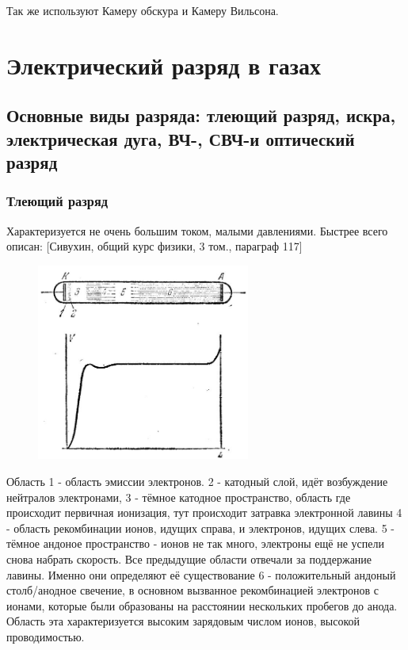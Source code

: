\documentclass[10pt, a4paper]{article}
\let\stdsection\section
\renewcommand\section{\newpage\stdsection}
\begin{document}
Так же используют Камеру обскура и Камеру Вильсона.

\section{Электрический разряд в газах}

\subsection{Основные виды разряда: тлеющий разряд, искра, электрическая дуга, ВЧ-, СВЧ-и оптический разряд}
\subsubsection{Тлеющий разряд}
Характеризуется не очень большим током, малыми давлениями.
Быстрее всего описан: [Сивухин, общий курс физики, 3 том., параграф 117]

\begin{figure}[ht]
	\begin{center}
		\includegraphics[width=70mm]{12.1.JPG}
	\end{center}
\end{figure}

Область 1 - область эмиссии электронов. 2 - катодный слой, идёт возбуждение нейтралов электронами, 3 - тёмное катодное пространство, область где происходит первичная ионизация, тут происходит затравка электронной лавины 4 - область рекомбинации ионов, идущих справа, и электронов, идущих слева. 5 - тёмное андоное пространство - ионов не так много, электроны ещё не успели снова набрать скорость. Все предыдущие области отвечали за поддержание лавины. Именно они определяют её существование  6 - положительный андоный столб/анодное свечение, в основном вызванное рекомбинацией электронов с ионами, которые были образованы на расстоянии нескольких пробегов до анода. Область эта характеризуется высоким зарядовым числом ионов, высокой проводимостью.
\end{document}
